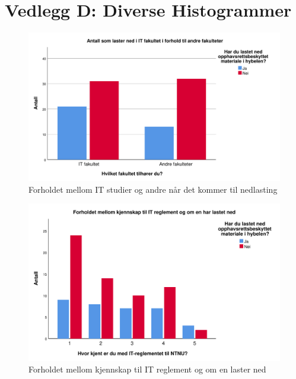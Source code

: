 \chapter*{Vedlegg D: Diverse Histogrammer}
\label{vedlegg:histogrammer}

\begin{figure}[H]
    \centering
    \includegraphics[scale=0.45]{case_1/bilder/IT_lasterned.pdf}
    \caption[IT-lasterned]{Forholdet mellom IT studier og andre når det kommer til nedlasting}
    \label{fig:IT-lasterned}
\end{figure}

\begin{figure}[H]
    \centering
    \includegraphics[scale=0.45]{case_1/bilder/reglement_lasterned.pdf}
    \caption[reglement-lasterned]{Forholdet mellom kjennskap til IT reglement og om en laster ned}
    \label{fig:reglement-lasterned}
\end{figure}

